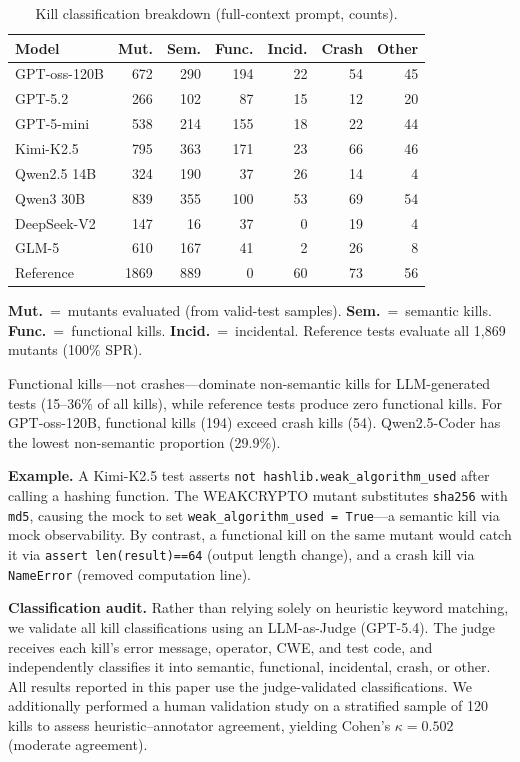 \documentclass[sigconf,anonymous,review]{acmart}
\begin{document}
\begin{table}[t]
\caption{Kill classification breakdown (full-context prompt, counts).}
\label{tab:kills}
\small
\begin{tabular}{lrrrrrr}
\toprule
\textbf{Model} & \textbf{Mut.} & \textbf{Sem.} & \textbf{Func.} & \textbf{Incid.} & \textbf{Crash} & \textbf{Other} \\
\midrule
GPT-oss-120B & 672 & 290 & 194 & 22 & 54 & 45 \\
GPT-5.2 & 266 & 102 & 87 & 15 & 12 & 20 \\
GPT-5-mini & 538 & 214 & 155 & 18 & 22 & 44 \\
Kimi-K2.5 & 795 & 363 & 171 & 23 & 66 & 46 \\
Qwen2.5 14B & 324 & 190 & 37 & 26 & 14 & 4 \\
Qwen3 30B & 839 & 355 & 100 & 53 & 69 & 54 \\
DeepSeek-V2 & 147 & 16 & 37 & 0 & 19 & 4 \\
GLM-5 & 610 & 167 & 41 & 2 & 26 & 8 \\
\midrule
Reference & 1869 & 889 & 0 & 60 & 73 & 56 \\
\bottomrule
\end{tabular}
\vspace{2pt}
{\footnotesize \textbf{Mut.}~=~mutants evaluated (from valid-test samples). \textbf{Sem.}~=~semantic kills. \textbf{Func.}~=~functional kills. \textbf{Incid.}~=~incidental. Reference tests evaluate all 1,869 mutants (100\% SPR).}
\end{table}



Functional kills---not crashes---dominate non-semantic kills for LLM-generated tests (15--36\% of all kills), while reference tests produce zero functional kills. For GPT-oss-120B, functional kills (194) exceed crash kills (54). Qwen2.5-Coder has the lowest non-semantic proportion (29.9\%).




\textbf{Example.} A Kimi-K2.5 test asserts \texttt{not hashlib.weak\_algorithm\_used} after calling a hashing function. The WEAKCRYPTO mutant substitutes \texttt{sha256} with \texttt{md5}, causing the mock to set \texttt{weak\_algorithm\_used = True}---a semantic kill via mock observability. By contrast, a functional kill on the same mutant would catch it via \texttt{assert len(result)==64} (output length change), and a crash kill via \texttt{NameError} (removed computation line).



\textbf{Classification audit.} Rather than relying solely on heuristic keyword matching, we validate all kill classifications using an LLM-as-Judge (GPT-5.4). The judge receives each kill's error message, operator, CWE, and test code, and independently classifies it into semantic, functional, incidental, crash, or other. All results reported in this paper use the judge-validated classifications. We additionally performed a human validation study on a stratified sample of 120 kills to assess heuristic--annotator agreement, yielding Cohen's $\kappa = 0.502$ (moderate agreement).
\end{document}
